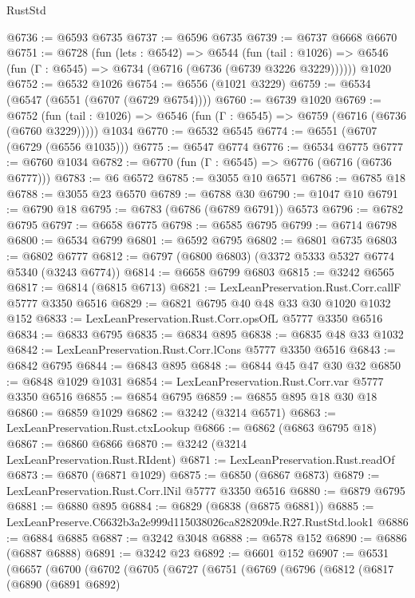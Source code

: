 \begin{lexlean}{RustStd}
\begin{coremodule}
@6736 := @6593 @6735
@6737 := @6596 @6735
@6739 := @6737 @6668 @6670
@6751 := @6728
    (fun (lets : @6542) =>
    @6544
      (fun (tail : @1026) => @6546 (fun (Γ : @6545) => @6734 (@6716 (@6736 (@6739 @3226 @3229))))))
    @1020
@6752 := @6532 @1026
@6754 := @6556 (@1021 @3229)
@6759 := @6534 (@6547 (@6551 (@6707 (@6729 @6754))))
@6760 := @6739 @1020
@6769 := @6752
    (fun (tail : @1026) => @6546 (fun (Γ : @6545) => @6759 (@6716 (@6736 (@6760 @3229)))))
    @1034
@6770 := @6532 @6545
@6774 := @6551 (@6707 (@6729 (@6556 @1035)))
@6775 := @6547 @6774
@6776 := @6534 @6775
@6777 := @6760 @1034
@6782 := @6770 (fun (Γ : @6545) => @6776 (@6716 (@6736 @6777)))
@6783 := @6 @6572
@6785 := @3055 @10 @6571
@6786 := @6785 @18
@6788 := @3055 @23 @6570
@6789 := @6788 @30
@6790 := @1047 @10
@6791 := @6790 @18
@6795 := @6783 (@6786 (@6789 @6791)) @6573
@6796 := @6782 @6795
@6797 := @6658 @6775
@6798 := @6585 @6795
@6799 := @6714 @6798
@6800 := @6534 @6799
@6801 := @6592 @6795
@6802 := @6801 @6735
@6803 := @6802 @6777
@6812 := @6797 (@6800 @6803) (@3372 @5333 @5327 @6774 @5340 (@3243 @6774))
@6814 := @6658 @6799 @6803
@6815 := @3242 @6565
@6817 := @6814 (@6815 @6713)
@6821 := LexLeanPreservation.Rust.Corr.callF @5777 @3350 @6516
@6829 := @6821 @6795 @40 @48 @33 @30 @1020 @1032 @152
@6833 := LexLeanPreservation.Rust.Corr.opsOfL @5777 @3350 @6516
@6834 := @6833 @6795
@6835 := @6834 @895
@6838 := @6835 @48 @33 @1032
@6842 := LexLeanPreservation.Rust.Corr.lCons @5777 @3350 @6516
@6843 := @6842 @6795
@6844 := @6843 @895
@6848 := @6844 @45 @47 @30 @32
@6850 := @6848 @1029 @1031
@6854 := LexLeanPreservation.Rust.Corr.var @5777 @3350 @6516
@6855 := @6854 @6795
@6859 := @6855 @895 @18 @30 @18
@6860 := @6859 @1029
@6862 := @3242 (@3214 @6571)
@6863 := LexLeanPreservation.Rust.ctxLookup
@6866 := @6862 (@6863 @6795 @18)
@6867 := @6860 @6866
@6870 := @3242 (@3214 LexLeanPreservation.Rust.RIdent)
@6871 := LexLeanPreservation.Rust.readOf
@6873 := @6870 (@6871 @1029)
@6875 := @6850 (@6867 @6873)
@6879 := LexLeanPreservation.Rust.Corr.lNil @5777 @3350 @6516
@6880 := @6879 @6795
@6881 := @6880 @895
@6884 := @6829 (@6838 (@6875 @6881))
@6885 := LexLeanPreserve.C6632b3a2e999d115038026ca828209de.R27.RustStd.look1
@6886 := @6884 @6885
@6887 := @3242 @3048
@6888 := @6578 @152
@6890 := @6886 (@6887 @6888)
@6891 := @3242 @23
@6892 := @6601 @152
@6907 := @6531
    (@6657
      (@6700
        (@6702
          (@6705
            (@6727
              (@6751
                (@6769
                  (@6796
                    (@6812
                      (@6817
                        (@6890
                          (@6891 @6892)

\end{coremodule}
\end{lexlean}
